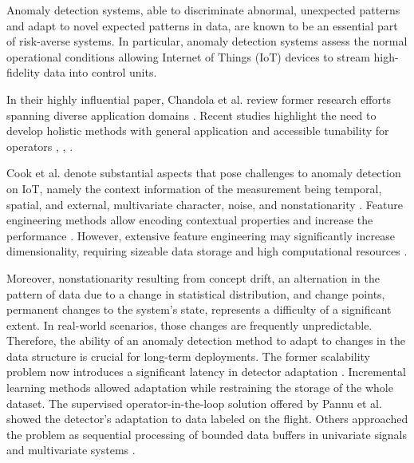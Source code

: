 Anomaly detection systems, able to discriminate abnormal, unexpected patterns and adapt to novel expected patterns in data, are known to be an essential part of risk-averse systems. In particular, anomaly detection systems assess the normal operational conditions allowing Internet of Things (IoT) devices to stream high-fidelity data into control units.

In their highly influential paper, Chandola et al. review former research efforts spanning diverse application domains \cite{Chandola2009}.
Recent studies highlight the need to develop holistic methods with general application and accessible tunability for operators \cite{Laptev2015}, \cite{Kejariwal2015}, \cite{Cook2020}. 

Cook et al. denote substantial aspects that pose challenges to anomaly detection on IoT, namely the context information of the measurement being temporal, spatial, and external, multivariate character, noise, and nonstationarity \cite{Cook2020}. Feature engineering methods allow encoding contextual properties and increase the performance \cite{Fan2019}. However, extensive feature engineering may significantly increase dimensionality, requiring sizeable data storage and high computational resources \cite{Talagala2021}. 

Moreover, nonstationarity resulting from concept drift, an alternation in the pattern of data due to a change in statistical distribution, and change points, permanent changes to the system's state, represents a difficulty of a significant extent. In real-world scenarios, those changes are frequently unpredictable. Therefore, the ability of an anomaly detection method to adapt to changes in the data structure is crucial for long-term deployments. The former scalability problem now introduces a significant latency in detector adaptation \cite{Wu2021}. Incremental learning methods allowed adaptation while restraining the storage of the whole dataset. The supervised operator-in-the-loop solution offered by Pannu et al. showed the detector's adaptation to data labeled on the flight. 
Others approached the problem as sequential processing of bounded data buffers in univariate signals \cite{Ahmad2017134} and multivariate systems \cite{Bosman201514}. 

